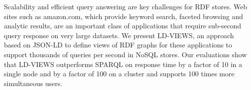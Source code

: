 Scalability and efficient query answering are key challenges for RDF stores.
Web sites such as amazon.com, which provide keyword search, faceted browsing and analytic results, are an important class of applications that require sub-second query response on very large datasets.
We present LD-VIEWS, an approach based on JSON-LD to define views of RDF graphs for these applications to support thousands of queries per second in NoSQL stores.
Our evaluations show that LD-VIEWS outperforms SPARQL on response time by a factor of 10 in a single node and by a factor of 100 on a cluster and supports 100 times more simultaneous users.

